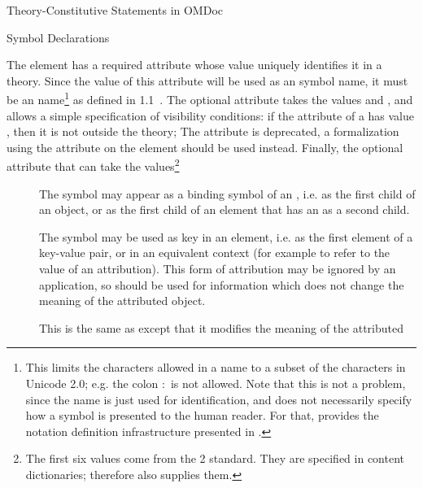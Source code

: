 \begin{omgroup}[short=Mathematical Statements,id=statements]
\begin{omgroup}[id=constitutive-statements]{Theory-Constitutive Statements in OMDoc}
\begin{module}[id=constitutive-statements]
\begin{omgroup}[id=symbol-dec]{Symbol Declarations}
\begin{definition}[id=symbol.def]
  The {} element has a required attribute  whose
  value uniquely identifies it in a theory.  Since the value of this attribute will be
  used as an {\openmath} symbol name, it must be an {\xml} name\footnote{This limits the
    characters allowed in a name to a subset of the characters in Unicode 2.0; e.g. the
    colon $\colon$ is not allowed. Note that this is not a problem, since the name is just
    used for identification, and does not necessarily specify how a symbol is presented to
    the human reader. For that, \omdoc provides the notation definition infrastructure
    presented in .} as defined in {\xml} 1.1~\cite{xml1.1:04}. The optional
  attribute  takes the values 
  and , and allows a simple specification of visibility
  conditions: if the  attribute of a  has
  value , then it is not 
  outside the theory; The {} attribute is deprecated, a
  formalization using the  attribute on the
   element should be used instead.  Finally, the optional attribute
   that can take the values\footnote{The first six values come
    from the {\openmath}2 standard. They are specified in content dictionaries; therefore
    \omdoc also supplies them.}
\begin{description}
\item[] The symbol may appear as a binding symbol of an
  {}, i.e. as the first child of an 
  object, or as the first child of an  element that has an
   as a second child.
\item[] The symbol may be used as key in an
  {\openmath}  element, i.e. as the first element of a
  key-value pair, or in an equivalent context (for example to refer to the value of an
  attribution).  This form of attribution may be ignored by an application, so should be
  used for information which does not change the meaning of the attributed {\openmath}
  object.
\item[] This is the same as
  {} except that it modifies the meaning of the attributed

\end{description}
\end{definition}
\end{omgroup}
\end{module}
\end{omgroup}
\end{omgroup}
